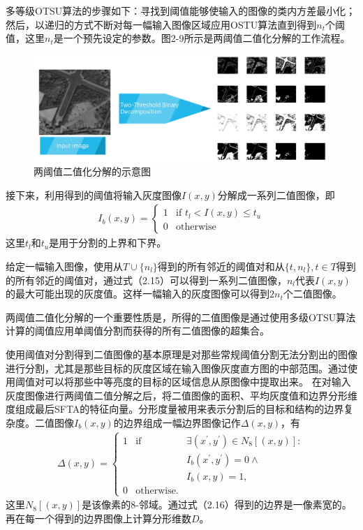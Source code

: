 \documentclass[supercite]{HustGraduPaper}
\begin{document}
\begin{sloppypar}
  多等级OTSU算法的步骤如下：寻找到阈值能够使输入的图像的类内方差最小化；然后，以递归的方式不断对每一幅输入图像区域应用OSTU算法直到得到$n_t$个阈值，这里$n_t$是一个预先设定的参数。图2-9所示是两阈值二值化分解的工作流程。
  \begin{figure}[H]
    \setlength{\abovecaptionskip}{0.2cm}
    \setlength{\belowcaptionskip}{-0.cm}
      \centering%
      \includegraphics[scale=0.5]{12.jpg}
      \caption{两阈值二值化分解的示意图}
    \end{figure}
  
  接下来，利用得到的阈值将输入灰度图像$I(x,y)$分解成一系列二值图像，即\begin{gather}
   I_b(x,y)=\left\{
    \begin{array}{ll}
       1&\text{if }t_l<I(x,y)\leq t_u\\
       0&\text{otherwise}
    \end{array}
   \right.
  \end{gather}
  这里$t_l$和$t_u$是用于分割的上界和下界。

  给定一幅输入图像，使用从$T\cup\{ n_l \}$得到的所有邻近的阈值对和从$\{ t,n_l \},t\in T$得到的所有邻近的阈值对，通过式（2.15）可以得到一系列二值图像，$n_l$代表$I(x,y)$的最大可能出现的灰度值。这样一幅输入的灰度图像可以得到$2n_t$个二值图像。

  两阈值二值化分解的一个重要性质是，所得的二值图像是通过使用多级OTSU算法计算的阈值应用单阈值分割而获得的所有二值图像的超集合。

  使用阈值对分割得到二值图像的基本原理是对那些常规阈值分割无法分割出的图像进行分割，尤其是那些目标的灰度区域在输入图像灰度直方图的中部范围。通过使用阈值对可以将那些中等亮度的目标的区域信息从原图像中提取出来。
  在对输入灰度图像进行两阈值二值分解之后，将二值图像的面积、平均灰度值和边界分形维度组成最后SFTA的特征向量。分形度量被用来表示分割后的目标和结构的边界复杂度。二值图像$I_b(x,y)$的边界组成一幅边界图像记作$\Delta(x,y)$，有\begin{gather}
   \Delta(x,y)=\left\{
    \begin{array}{lll}
      1&\text{if}&\exists(x^{'},y^{'})\in N_8[(x,y)]:\\
       &         &I_b(x^{'},y^{'})=0\land\\
       &         &I_b(x,y)=1,\\
      0&\text{otherwise.}&
    \end{array}
   \right.
  \end{gather}
  这里$N_8[(x,y)]$是该像素的8-邻域。通过式（2.16）得到的边界是一像素宽的。再在每一个得到的边界图像上计算分形维数$D$。


\end{sloppypar}
\end{document}
